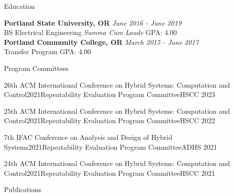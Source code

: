 \documentclass{resume}
\begin{document}
\begin{rSection}{Education}

{\bf Portland State University, OR} \hfill {\em June 2016 - June 2019} 
\\ BS Electrical Engineering \quad \textit{Summa Cum Laude}\hfill { GPA: 4.00 }
\\{\bf Portland Community College, OR} \hfill {\em March 2015 - June 2017} 
\\ Transfer Program \hfill { GPA: 4.00 }

\end{rSection}

\begin{rSection}{Program Committees}

\begin{rSubsectionEmpty}{26th ACM International Conference on Hybrid Systems: Computation and Control}{2021}{Repeatability Evaluation Program Committee}{HSCC 2023}
\end{rSubsectionEmpty}

\begin{rSubsectionEmpty}{25th ACM International Conference on Hybrid Systems: Computation and Control}{2021}{Repeatability Evaluation Program Committee}{HSCC 2022}
\end{rSubsectionEmpty}


\begin{rSubsectionEmpty}{7th IFAC Conference on Analysis and Design of Hybrid Systems}{2021}{Repeatability Evaluation Program Committee}{ADHS 2021}
\end{rSubsectionEmpty}

\begin{rSubsectionEmpty}{24th ACM International Conference on Hybrid Systems: Computation and Control}{2021}{Repeatability Evaluation Program Committee}{HSCC 2021}
\end{rSubsectionEmpty}

\end{rSection}

\begin{rSection}{Publications}



\end{rSection}
\end{document}

